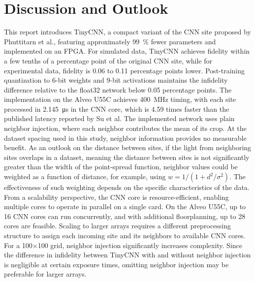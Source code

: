 \section{Discussion and Outlook}\label{sec:discussion}

This report introduces TinyCNN, a compact variant of the CNN site proposed by Phuttitarn et al., featuring approximately \SI{99}{\percent} fewer parameters and implemented on an FPGA. For simulated data, TinyCNN achieves fidelity within a few tenths of a percentage point of the original CNN site, while for experimental data, fidelity is \num{0.06} to \num{0.11} percentage points lower. Post-training quantization to 6-bit weights and 9-bit activations maintains the infidelity difference relative to the float32 network below \num{0.05} percentage points. The implementation on the Alveo U55C achieves \SI{400}{\mega\hertz} timing, with each site processed in \SI{2.145}{\micro\second} in the CNN core, which is \num{4.59} times faster than the published latency reported by Su et al.
The implemented network uses plain neighbor injection, where each neighbor contributes the mean of its crop. At the dataset spacing used in this study, neighbor information provides no measurable benefit. As an outlook on the distance between sites, if the light from neighboring sites overlaps in a dataset, meaning the distance between sites is not significantly greater than the width of the point-spread function, neighbor values could be weighted as a function of distance, for example, using $w = 1/(1 + d^2/\sigma^2)$. The effectiveness of such weighting depends on the specific characteristics of the data.
From a scalability perspective, the CNN core is resource-efficient, enabling multiple cores to operate in parallel on a single card. On the Alveo U55C, up to 16 CNN cores can run concurrently, and with additional floorplanning, up to 28 cores are feasible. Scaling to larger arrays requires a different preprocessing structure to assign each incoming site and its neighbors to available CNN cores. For a 100×100 grid, neighbor injection significantly increases complexity. Since the difference in infidelity between TinyCNN with and without neighbor injection is negligible at certain exposure times, omitting neighbor injection may be preferable for larger arrays.

